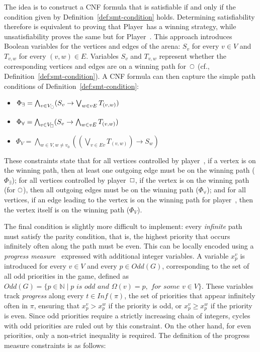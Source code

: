 \documentclass[letterpaper]{article} %
\begin{document}
The idea is to construct a CNF formula that is satisfiable if and only if the condition given by Definition~\ref{def:smt-condition} holds. Determining satisfiability therefore is equivalent to proving that Player~\even has a winning strategy, while unsatisfiability proves the same but for Player~\odd.
%
This approach introduces Boolean variables for the vertices and edges of the arena: $S_v$ for every $v \in V$ and $T_{v,w}$ for every $(v, w) \in E$. Variables $S_v$ and $T_{v,w}$ represent whether the corresponding vertices and edges are on a winning path for~$\even$ (cf., Definition~\ref{def:smt-condition}).
%
%
A CNF formula can then capture the simple path conditions of Definition~\ref{def:smt-condition}:

\begin{itemize}
    \item $\Phi_\exists = \bigwedge_{v \in V_{\subeven}} (S_v \rightarrow \bigvee_{w \in vE} T_{(v,w)})$
    \item $\Phi_\forall = \bigwedge_{v \in V_{\subodd}} (S_v \rightarrow \bigwedge_{w \in vE} T_{(v,w)})$
    \item $\Phi_V = \bigwedge_{w \in V, w \neq v_0} \left( \left(\bigvee_{v \in Ev} T_{(v,w)}\right) \rightarrow S_w \right)$
\end{itemize}

These constraints state that for all vertices controlled by player~\even, if a vertex is on the winning path, then at least one outgoing edge must be on the winning path ($\Phi_\exists$); for all vertices controlled by player~$\odd$, if the vertex is on the winning path (for $\even$), then all outgoing edges must be on the winning path ($\Phi_\forall$); and for all vertices, if an edge leading to the vertex is on the winning path for player~\even, then the vertex itself is on the winning path ($\Phi_V$).

The final condition is slightly more difficult to implement: every \textit{infinite} path must satisfy the parity condition, that is, the highest priority that occurs infinitely often along the path must be even. This can be locally encoded using a \textit{progress measure}~\cite{Heljanko:2012,Jurdziński:2000} expressed with additional integer variables. A variable $x_p^v$ is introduced for every $v \in V$ and every $p \in \textit{Odd}(G)$, corresponding to the set of all odd priorities in the game, defined as $\textit{Odd}(G) = \{ p\in {\mathbb N} \mid p \textit{ is odd and } \Omega(v) = p, \textit{ for some } v \in V \}$. These variables track \textit{progress} along every $ t \in \textit{Inf}(\pi) $, the set of priorities that appear infinitely often in $\pi$, ensuring that $x_p^v > x_p^w$ if the priority is odd, or $x_p^v \geq x_p^w$ if the priority is even. Since odd priorities require a strictly increasing chain of integers, cycles with odd priorities are ruled out by this constraint. On the other hand, for even priorities, only a non-strict inequality is required.
%
The definition of the progress measure constraints is as follows: \cite{Heljanko:2012,Cotton:2004}
\end{document}
